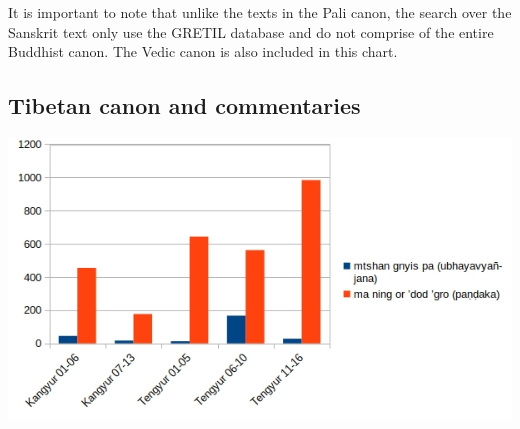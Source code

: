 \medskip
It is important to note that unlike the texts in the Pali canon, the search over the Sanskrit text only use the GRETIL database and do not comprise of the entire Buddhist canon. The Vedic canon is also included in this chart.


\subsection{Tibetan canon and commentaries}

\includegraphics[width=\linewidth]{tibetan.jpg}
\label{tibetan1}

